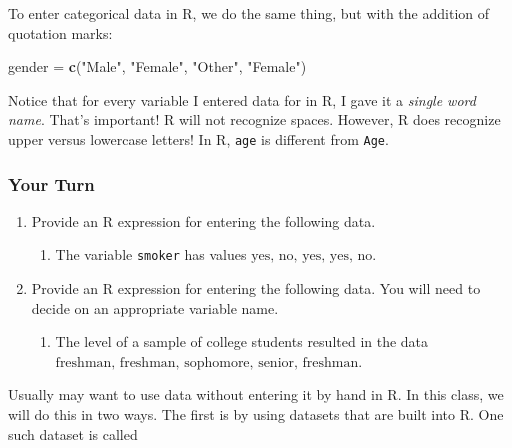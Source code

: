 \documentclass[
]{book}
\newenvironment{Shaded}{\begin{snugshade}}{\end{snugshade}}
\newcommand{\FunctionTok}[1]{\textcolor[rgb]{0.13,0.29,0.53}{\textbf{#1}}}
\newcommand{\NormalTok}[1]{#1}
\newcommand{\OtherTok}[1]{\textcolor[rgb]{0.56,0.35,0.01}{#1}}
\newcommand{\StringTok}[1]{\textcolor[rgb]{0.31,0.60,0.02}{#1}}
\providecommand{\tightlist}{%
  \setlength{\itemsep}{0pt}\setlength{\parskip}{0pt}}
\begin{document}
To enter categorical data in R, we do the same thing, but with the addition of quotation marks:

\begin{Shaded}
\begin{Highlighting}[]
\NormalTok{gender }\OtherTok{=} \FunctionTok{c}\NormalTok{(}\StringTok{"Male"}\NormalTok{, }\StringTok{"Female"}\NormalTok{, }\StringTok{"Other"}\NormalTok{, }\StringTok{"Female"}\NormalTok{)}
\end{Highlighting}
\end{Shaded}

Notice that for every variable I entered data for in R, I gave it a \emph{single word name}. That's important! R will not recognize spaces. However, R does recognize upper versus lowercase letters! In R, \texttt{age} is different from \texttt{Age}.

\subsubsection*{Your Turn}\label{your-turn-4}

\begin{enumerate}
\def\labelenumi{\arabic{enumi}.}
\setcounter{enumi}{6}
\tightlist
\item
  Provide an R expression for entering the following data.

  \begin{enumerate}
  \def\labelenumii{\alph{enumii}.}
  \tightlist
  \item
    The variable \texttt{smoker} has values \(\text{yes, no, yes, yes, no}\).
  \end{enumerate}
\item
  Provide an R expression for entering the following data. You will need to decide on an appropriate variable name.

  \begin{enumerate}
  \def\labelenumii{\alph{enumii}.}
  \tightlist
  \item
    The level of a sample of college students resulted in the data \(\text{freshman, freshman, sophomore, senior, freshman}\).
  \end{enumerate}
\end{enumerate}

Usually may want to use data without entering it by hand in R. In this class, we will do this in two ways. The first is by using datasets that are built into R. One such dataset is called
\end{document}
